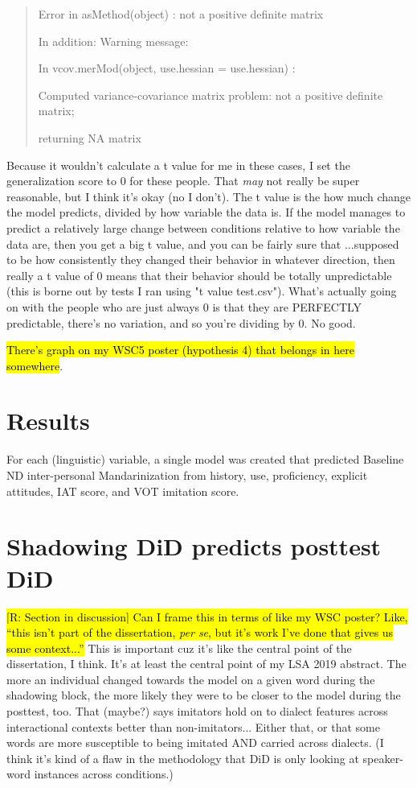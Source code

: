 \begin{quote}
Error in asMethod(object) : not a positive definite matrix

In addition: Warning message:

In vcov.merMod(object, use.hessian = use.hessian) :

Computed variance-covariance matrix problem: not a positive definite matrix;

returning NA matrix
\end{quote}
Because it wouldn't calculate a t value for me in these cases, I set the generalization score to 0 for these people. That \textit{may} not really be super reasonable, but I think it's okay (no I don't). The t value is the how much change the model predicts, divided by how variable the data is. If the model manages to predict a relatively large change between conditions relative to how variable the data are, then you get a big t value, and you can be fairly sure that ...supposed to be how consistently they changed their behavior in whatever direction, then really a t value of 0 means that their behavior should be totally unpredictable (this is borne out by tests I ran using "t value test.csv"). What's actually going on with the people who are just always 0 is that they are PERFECTLY predictable, there's no variation, and so you're dividing by 0. No good.

\hl{There's graph on my WSC5 poster (hypothesis 4) that belongs in here somewhere}.

\section{Results}
\label{sec:externalResults}
For each (linguistic) variable, a single model was created that predicted Baseline ND inter-personal Mandarinization from history, use, proficiency, explicit attitudes, IAT score, and VOT imitation score. 

\section{Shadowing DiD predicts posttest DiD}
\hl{[R: Section in discussion] Can I frame this in terms of like my WSC poster? Like, ``this isn't part of the dissertation, \textit{per se}, but it's work I've done that gives us some context...''} This is important cuz it's like the central point of the dissertation, I think. It's at least the central point of my LSA 2019 abstract. The more an individual changed towards the model on a given word during the shadowing block, the more likely they were to be closer to the model during the posttest, too. That (maybe?) says imitators hold on to dialect features across interactional contexts better than non-imitators... Either that, or that some words are more susceptible to being imitated AND carried across dialects. (I think it's kind of a flaw in the methodology that DiD is only looking at speaker-word instances across conditions.)

